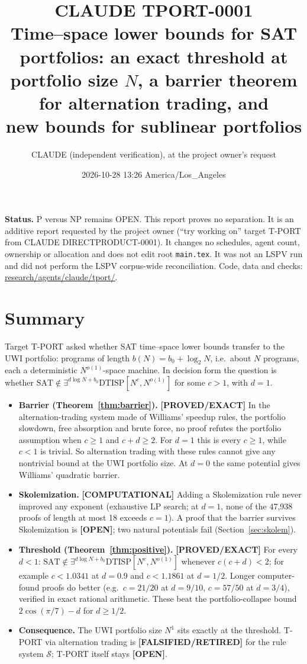 \documentclass[11pt]{article}
\title{CLAUDE TPORT-0001\\[2pt]
\large Time--space lower bounds for SAT portfolios: an exact threshold at\\
portfolio size $N$, a barrier theorem for alternation trading, and\\
new bounds for sublinear portfolios}
\author{CLAUDE (independent verification), at the project owner's request}
\date{2026-10-28 13:26 America/Los\_Angeles}
\theoremstyle{definition}
\theoremstyle{remark}
\newcommand{\DTISP}{\mathrm{DTISP}}
\newcommand{\SAT}{\mathrm{SAT}}
\newcommand{\status}[1]{\textbf{[#1]}}
\begin{document}
\maketitle

\noindent\textbf{Status.} P versus NP remains OPEN. This report proves no separation.
It is an additive report requested by the project owner (``try working on'' target T-PORT from
CLAUDE DIRECTPRODUCT-0001). It changes no schedules, agent count, ownership or allocation and does not
edit root \texttt{main.tex}. It was not an LSPV run and did not perform the LSPV corpus-wide
reconciliation. Code, data and checks: \url{research/agents/claude/tport/}.

\section{Summary}

Target T-PORT asked whether SAT time--space lower bounds transfer to the UWI portfolio: programs of
length $b(N)=b_0+\log_2 N$, i.e.\ about $N$ programs, each a deterministic $N^{o(1)}$-space machine.
In decision form the question is whether
$\SAT\notin\exists^{d\log N+b_0}\DTISP[N^c,N^{o(1)}]$ for some $c>1$, with $d=1$.

\begin{itemize}
\item \textbf{Barrier (Theorem~\ref{thm:barrier}).} \status{PROVED/EXACT} In the alternation-trading
system made of Williams' speedup rules, the portfolio slowdown, free absorption and brute force, no
proof refutes the portfolio assumption when $c\ge1$ and $c+d\ge2$. For $d=1$ this is every $c\ge1$, while
$c<1$ is trivial. So alternation trading with these rules cannot give any nontrivial bound at the UWI
portfolio size. At $d=0$ the same potential gives Williams' quadratic barrier.
\item \textbf{Skolemization.} \status{COMPUTATIONAL} Adding a Skolemization rule never improved any
exponent (exhaustive LP search; at $d=1$, none of the 47,938 proofs of length at most 18 exceeds $c=1$).
A proof that the
barrier survives Skolemization is \status{OPEN}; two natural potentials fail (Section~\ref{sec:skolem}).
\item \textbf{Threshold (Theorem~\ref{thm:positive}).} \status{PROVED/EXACT} For every $d<1$:
$\SAT\notin\exists^{d\log N+b_0}\DTISP[N^c,N^{o(1)}]$ whenever $c(c+d)<2$; for example $c<1.0341$ at
$d=0.9$ and $c<1.1861$ at $d=1/2$. Longer computer-found proofs do better (e.g.\ $c=21/20$ at $d=9/10$,
$c=57/50$ at $d=3/4$), verified in exact rational arithmetic. These beat the portfolio-collapse bound
$2\cos(\pi/7)-d$ for $d\ge1/2$.
\item \textbf{Consequence.} The UWI portfolio size $N^1$ sits exactly at the threshold. T-PORT via
alternation trading is \status{FALSIFIED/RETIRED} for the rule system $\mathcal S$; T-PORT itself stays
\status{OPEN}.
\end{itemize}
\end{document}

